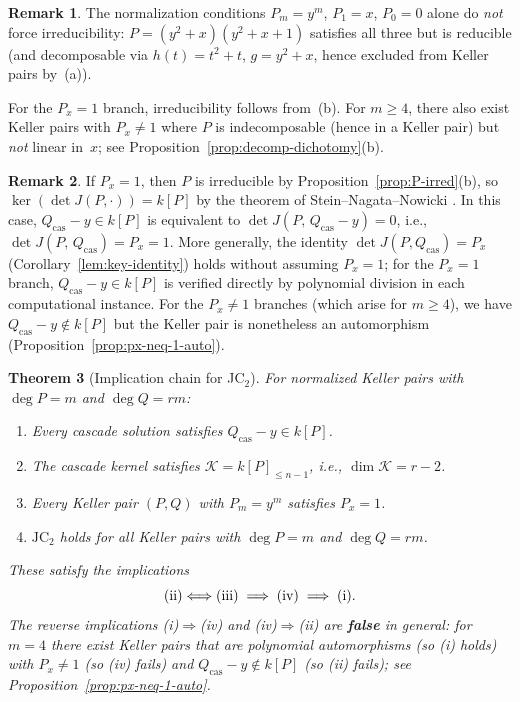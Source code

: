 \documentclass[12pt,a4paper]{article}
\newtheorem{theorem}{Theorem}[section]
\theoremstyle{definition}
\newtheorem{remark}[theorem]{Remark}
\newcommand{\kk}{k}
\begin{document}
\begin{remark}\label{rem:irred-counterex}
The normalization conditions $P_m = y^m$, $P_1 = x$, $P_0 = 0$ alone
do \emph{not} force irreducibility: $P = (y^2+x)(y^2+x+1)$ satisfies
all three but is reducible (and decomposable via $h(t) = t^2 + t$,
$g = y^2 + x$, hence excluded from Keller pairs by~\textup{(a)}).

For the $P_x = 1$ branch, irreducibility follows from~\textup{(b)}.
For $m \geq 4$, there also exist Keller pairs with $P_x \neq 1$
where $P$ is indecomposable (hence in a Keller pair) but
\emph{not} linear in~$x$; see Proposition~\ref{prop:decomp-dichotomy}(b).
\end{remark}

\begin{remark}
If $P_x = 1$, then $P$ is irreducible by
Proposition~\ref{prop:P-irred}(b), so
$\ker(\det J(P, \cdot)) = \kk[P]$ by the theorem of
Stein--Nagata--Nowicki \cite{Nagata1977,Nowicki1988}.
In this case, $Q_{\mathrm{cas}} - y \in \kk[P]$ is equivalent to
$\det J(P,\, Q_{\mathrm{cas}} - y) = 0$, i.e.,
$\det J(P,\, Q_{\mathrm{cas}}) = P_x = 1$.
More generally, the identity $\det J(P, Q_{\mathrm{cas}}) = P_x$
(Corollary~\ref{lem:key-identity}) holds without assuming $P_x = 1$;
for the $P_x = 1$ branch,
$Q_{\mathrm{cas}} - y \in \kk[P]$ is verified directly by polynomial
division in each computational instance. For the $P_x \neq 1$
branches (which arise for $m \geq 4$), we have
$Q_{\mathrm{cas}} - y \notin \kk[P]$ but the Keller pair is
nonetheless an automorphism (Proposition~\ref{prop:px-neq-1-auto}).
\end{remark}

\begin{theorem}[Implication chain for JC$_2$]\label{thm:equiv-chain}
For normalized Keller pairs with $\deg P = m$ and $\deg Q = rm$:
\begin{enumerate}
\item[\textup{(ii)}] Every cascade solution satisfies
  $Q_{\mathrm{cas}} - y \in \kk[P]$.
\item[\textup{(iii)}] The cascade kernel satisfies
  $\mathcal{K} = \kk[P]_{\leq n-1}$, i.e.,
  $\dim \mathcal{K} = r-2$.
\item[\textup{(iv)}] Every Keller pair $(P,Q)$ with $P_m = y^m$
  satisfies $P_x = 1$.
\item[\textup{(i)}] $\mathrm{JC}_2$ holds for all Keller pairs with
  $\deg P = m$ and $\deg Q = rm$.
\end{enumerate}
These satisfy the implications
\[
  \textup{(ii)} \Longleftrightarrow \textup{(iii)}
  \;\Longrightarrow\; \textup{(iv)}
  \;\Longrightarrow\; \textup{(i)}.
\]
The reverse implications \textup{(i)}$\Rightarrow$\textup{(iv)}
and \textup{(iv)}$\Rightarrow$\textup{(ii)} are \textbf{false} in general:
for $m = 4$ there exist Keller pairs that are polynomial automorphisms
(so \textup{(i)} holds) with $P_x \neq 1$ (so \textup{(iv)} fails)
and $Q_{\mathrm{cas}} - y \notin \kk[P]$ (so \textup{(ii)} fails);
see Proposition~\textup{\ref{prop:px-neq-1-auto}}.
\end{theorem}
\end{document}
